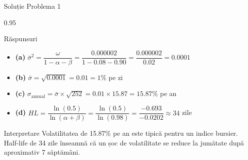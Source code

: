 \documentclass[9pt, aspectratio=169, t]{beamer}
\begin{document}
\begin{frame}{Soluție Problema 1}
    \begin{cminipage}{0.95\textwidth}
    \begin{exampleblock}{Răspunsuri}
        \begin{itemize}\setlength{\itemsep}{0pt}
            \item \textbf{(a)} $\bar{\sigma}^2 = \dfrac{\omega}{1 - \alpha - \beta} = \dfrac{0.000002}{1 - 0.08 - 0.90} = \dfrac{0.000002}{0.02} = 0.0001$

            \vspace{0.2cm}

            \item \textbf{(b)} $\bar{\sigma} = \sqrt{0.0001} = 0.01 = 1\%$ pe zi

            \vspace{0.2cm}

            \item \textbf{(c)} $\sigma_{\text{annual}} = \bar{\sigma} \times \sqrt{252} = 0.01 \times 15.87 = 15.87\%$ pe an

            \vspace{0.2cm}

            \item \textbf{(d)} $HL = \dfrac{\ln(0.5)}{\ln(\alpha + \beta)} = \dfrac{\ln(0.5)}{\ln(0.98)} = \dfrac{-0.693}{-0.0202} \approx 34$ zile
        \end{itemize}
    \end{exampleblock}

    \begin{block}{Interpretare}
        Volatilitatea de 15.87\% pe an este tipică pentru un indice bursier. Half-life de 34 zile înseamnă că un șoc de volatilitate se reduce la jumătate după aproximativ 7 săptămâni.
    \end{block}
    \end{cminipage}
\end{frame}
\end{document}
